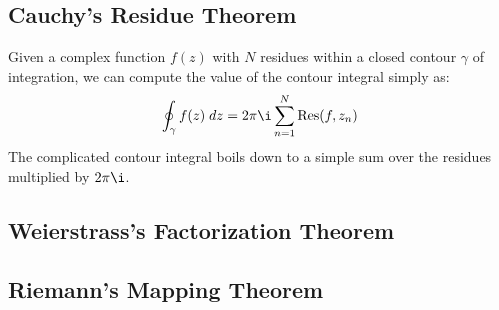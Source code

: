 \subsection{Cauchy's Residue Theorem}
Given a complex function $f(z)$ with $N$ residues within a closed contour $\gamma$ of integration, we can compute the value of the contour integral simply as:
\begin{equation}
\oint_{\gamma} f(z) \; dz = 2 \pi \i \sum_{n=1}^{N} \Res(f, z_n)
\end{equation}
The complicated contour integral boils down to a simple sum over the residues multiplied by $2 \pi \i$.




\subsection{Weierstrass's Factorization Theorem}








\subsection{Riemann's Mapping Theorem}



